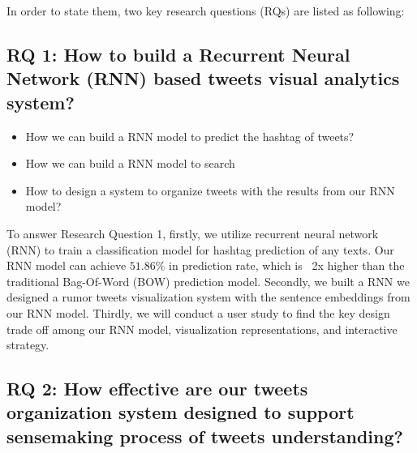 In order to state them, two key research questions (RQs) are listed as following: 

\subsection{RQ 1: How to build a Recurrent Neural Network (RNN) based tweets visual analytics system?}

\begin{itemize}
    \item How we can build a RNN model to predict the hashtag of tweets?
    \item How we can build a RNN model to search 
    \item How to design a system to organize tweets with the results from our RNN model? 

\end{itemize}

To answer Research Question 1,  firstly, we utilize recurrent neural network (RNN) to train a classification model for hashtag prediction of any texts. Our RNN model can achieve $51.86\%$ in prediction rate, which is ~2x higher than the traditional Bag-Of-Word (BOW) prediction model. Secondly, we built a RNN we designed a rumor tweets visualization system with the sentence embeddings from our RNN model. Thirdly, we will conduct a user study to find the key design trade off among our RNN model, visualization representations, and interactive strategy.

    
\subsection{RQ 2: How effective are our tweets organization system designed to support sensemaking process of tweets  understanding? }

